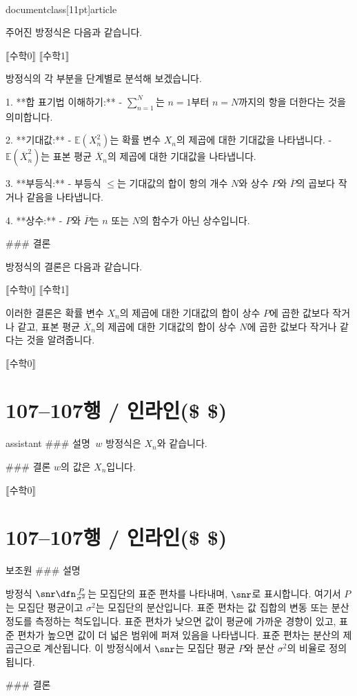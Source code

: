 \\documentclass[11pt]{article}
\begin{document}
주어진 방정식은 다음과 같습니다.

⟦수학0⟧
⟦수학1⟧

방정식의 각 부분을 단계별로 분석해 보겠습니다.

1. **합 표기법 이해하기:**
- \(\sum_{n=1}^N\)는 \(n=1\)부터 \(n=N\)까지의 항을 더한다는 것을 의미합니다.

2. **기대값:**
- \(\mathbb{E}(X_n^2)\)는 확률 변수 \(X_n\)의 제곱에 대한 기대값을 나타냅니다.
- \(\mathbb{E}(\overline{X}_n^2)\)는 표본 평균 \(\overline{X}_n\)의 제곱에 대한 기대값을 나타냅니다.

3. **부등식:**
- 부등식 \(\leq\)는 기대값의 합이 항의 개수 \(N\)와 상수 \(P\)와 \(\overline{P}\)의 곱보다 작거나 같음을 나타냅니다.

4. **상수:**
- \(P\)와 \(\overline{P}\)는 \(n\) 또는 \(N\)의 함수가 아닌 상수입니다.

### 결론

방정식의 결론은 다음과 같습니다.

⟦수학0⟧
⟦수학1⟧

이러한 결론은 확률 변수 \(X_n\)의 제곱에 대한 기대값의 합이 상수 \(P\)에 곱한 값보다 작거나 같고, 표본 평균 \(\overline{X}_n\)의 제곱에 대한 기대값의 합이 상수 \(N\)에 곱한 값보다 작거나 같다는 것을 알려줍니다.

⟦수학0⟧

\section*{107–107행 / 인라인(\$ \$) }
assistant
### 설명
\(\ w \) 방정식은 \( X_n \)와 같습니다.

### 결론
\( w \)의 값은 \( X_n \)입니다.

⟦수학0⟧

\section*{107–107행 / 인라인(\$ \$) }
보조원
### 설명

방정식 \(\snr\dfn\frac{P}{\sigma^2}\)는 모집단의 표준 편차를 나타내며, \(\snr\)로 표시합니다. 여기서 \(P\)는 모집단 평균이고 \(\sigma^2\)는 모집단의 분산입니다. 표준 편차는 값 집합의 변동 또는 분산 정도를 측정하는 척도입니다. 표준 편차가 낮으면 값이 평균에 가까운 경향이 있고, 표준 편차가 높으면 값이 더 넓은 범위에 퍼져 있음을 나타냅니다. 표준 편차는 분산의 제곱근으로 계산됩니다. 이 방정식에서 \(\snr\)는 모집단 평균 \(P\)와 분산 \(\sigma^2\)의 비율로 정의됩니다.

### 결론
\end{document}
